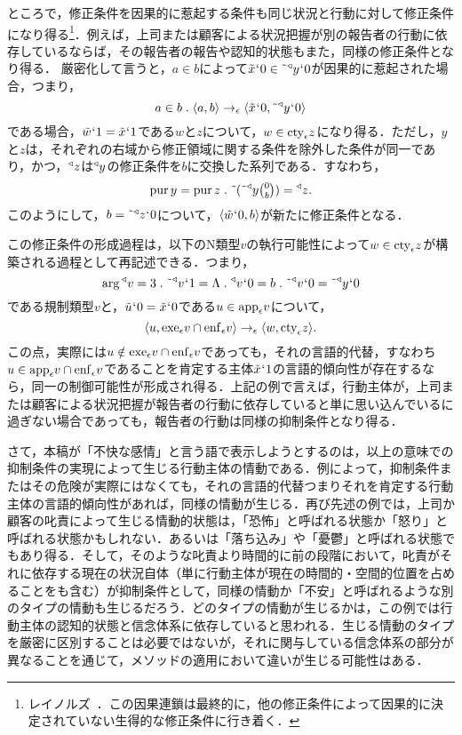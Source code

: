ところで，修正条件を因果的に惹起する条件も同じ状況と行動に対して修正条件になり得る\footnote{レイノルズ~\cite[p.\,12]{レイノルズ}．この因果連鎖は最終的に，他の修正条件によって因果的に決定されていない生得的な修正条件に行き着く．}．例えば，上司または顧客による状況把握が別の報告者の行動に依存しているならば，その報告者の報告や認知的状態もまた，同様の修正条件となり得る．
厳密化して言うと，$ a\in b $によって$ \tilde{x}{\mspace{1mu}{`}\mspace{1mu}} 0\in\tilde{\:\:}{^\triangleleft}y{\mspace{1mu}{`}\mspace{1mu}} 0 $が因果的に惹起された場合，つまり，
\[
    a\in b\con{1}\orp{a,b}\to_{\epsilon}\orp{\tilde{x}\fap0,\tildel{\trgl{y}}\fap 0}
\]
である場合，$ \tilde{w}{\mspace{1mu}{`}\mspace{1mu}} 1 = \tilde{x}{\mspace{1mu}{`}\mspace{1mu}} 1 $である$w$と$z$について，$w\in\mathrm{cty}_{\epsilon}z$になり得る．ただし，$y$と$z$は，それぞれの右域から修正領域に関する条件を除外した条件が同一であり，かつ，$ {^\triangleleft}z $は$ {^\triangleleft}y $の修正条件を$b$に交換した系列である．すなわち，
\[
    \mathrm{pur}\,y = \mathrm{pur}\,z\con{1}\tildel{(\tildel{\trgl{y}}\tbinom{0}{b})} = \trgl{z}.
\]
このようにして，$ b = \tilde{\:\:}{^\triangleleft}z{\mspace{1mu}{`}\mspace{1mu}} 0 $について，$ \langle \tilde{w}{\mspace{1mu}{`}\mspace{1mu}} 0,b \rangle $が新たに修正条件となる．

この修正条件の形成過程は，以下のN類型$v$の執行可能性によって$ w\in \mathrm{cty}_{\epsilon}z $が構築される過程として再記述できる．つまり，
\[
    \arg\trgl{v} = 3\con{1}\tildel{\trgl{v}}\fap 1 = \Lambda\con{1}\trgl{v}\fap 0 = b\con{1}
    \tildel{\trgl{v}}\fap 0 = \tildel{\trgl{y}}\fap 0
\]
である規制類型$v$と，$ \tilde{u}{\mspace{1mu}{`}\mspace{1mu}} 0 = \tilde{x}{\mspace{1mu}{`}\mspace{1mu}} 0 $である$ u\in\mathrm{app}_{\epsilon}v $について，
\[
   \langle u,\mathrm{exe}_{\epsilon}v\cap\mathrm{enf}_{\epsilon}v \rangle\to_{\epsilon}\langle w,\mathrm{cty}_{\epsilon}z \rangle.
\]
この点，実際には$ u\notin \mathrm{exe}_{\epsilon}v\cap\mathrm{enf}_{\epsilon}v $であっても，それの言語的代替，すなわち$ u\in \mathrm{app}_{\epsilon}v\cap\mathrm{enf}_{\epsilon}v $であることを肯定する主体$ \tilde{x}{\mspace{1mu}{`}\mspace{1mu}} 1 $の言語的傾向性が存在するなら，同一の制御可能性が形成され得る．上記の例で言えば，行動主体が，上司または顧客による状況把握が報告者の行動に依存していると単に思い込んでいるに過ぎない場合であっても，報告者の行動は同様の抑制条件となり得る．

さて，本稿が「不快な感情」と言う語で表示しようとするのは，以上の意味での抑制条件の実現によって生じる行動主体の情動である．例によって，抑制条件またはその危険が実際にはなくても，それの言語的代替つまりそれを肯定する行動主体の言語的傾向性があれば，同様の情動が生じる．再び先述の例では，上司か顧客の叱責によって生じる情動的状態は，「恐怖」と呼ばれる状態か「怒り」と呼ばれる状態かもしれない．あるいは「落ち込み」や「憂鬱」と呼ばれる状態でもあり得る．そして，そのような叱責より時間的に前の段階において，叱責がそれに依存する現在の状況自体（単に行動主体が現在の時間的・空間的位置を占めることをも含む）が抑制条件として，同様の情動か「不安」と呼ばれるような別のタイプの情動も生じるだろう．どのタイプの情動が生じるかは，この例では行動主体の認知的状態と信念体系に依存していると思われる．生じる情動のタイプを厳密に区別することは必要ではないが，それに関与している信念体系の部分が異なることを通じて，メソッドの適用において違いが生じる可能性はある．

